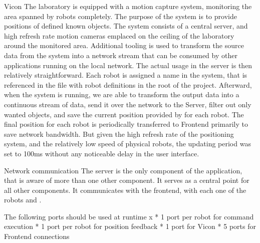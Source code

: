\secc Vicon
The laboratory is equipped with a {\vicon} motion capture system, monitoring the area spanned by robots completely. The purpose of the system is to provide positions of defined known objects.\br
The system consists of a central server, and high refresh rate motion cameras emplaced on the ceiling of the laboratory around the monitored area. Additional tooling is used to transform the source data from the {\vicon} system into a network stream that can be consumed by other applications running on the local network.\br
The actual usage in the server is then relatively straightforward. Each robot is assigned a name in the {\vicon} system, that is referenced in the file with robot definitions in the root of the project. Afterward, when the {\vicon} system is running, we are able to transform the output data into a continuous stream of data, send it over the network to the Server, filter out only wanted objects, and save the current position provided by {\vicon} for each robot. The final position for each robot is periodically transferred to Frontend primarily to save network bandwidth. But given the high refresh rate of the positioning system, and the relatively low speed of physical robots, the updating period was set to 100ms without any noticeable delay in the user interface.

\secc Network communication
The server is the only component of the application, that is aware of more than one other component. It serves as a central point for all other components. It communicates with the frontend, with each one of the robots and {\vicon}.

The following ports should be used at runtime
\begitems \style x
    * 1 port per robot for command execution
    * 1 port per robot for position feedback
    * 1 port for Vicon
    * 5 ports for Frontend connections
\enditems

